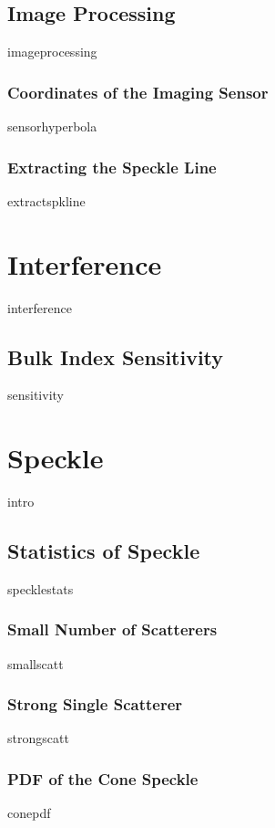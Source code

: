 \documentclass[a4paper,titlepage,onecolumn]{report}
\begin{document}
\section{Image Processing}
{imageprocessing}
\subsection{Coordinates of the Imaging Sensor}
{sensorhyperbola}
\subsection{Extracting the Speckle Line}
{extractspkline}

\chapter{Interference} \label{ch:interference}
{interference}
\section{Bulk Index Sensitivity}
{sensitivity}

\chapter{Speckle} \label{ch:speckle}
{intro}
\section{Statistics of Speckle}
{specklestats}
\subsection{Small Number of Scatterers}
{smallscatt}
\subsection{Strong Single Scatterer}
{strongscatt}
\subsection{PDF of the Cone Speckle}
{conepdf}
\end{document}
